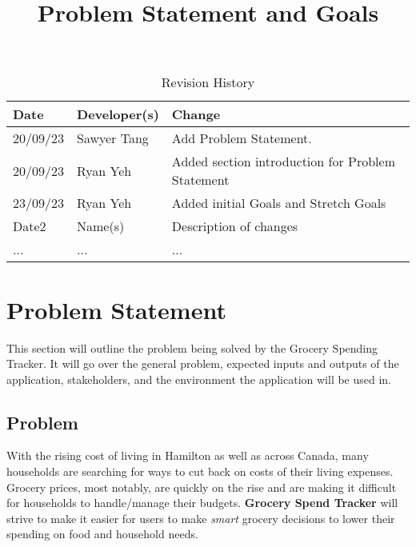 \documentclass{article}
\title{Problem Statement and Goals\\\progname}
\author{\authname}
\date{}
\begin{document}
\maketitle

\begin{table}[hp]
\caption{Revision History} \label{TblRevisionHistory}
\begin{tabularx}{\textwidth}{llX}
\toprule
\textbf{Date} & \textbf{Developer(s)} & \textbf{Change}\\
\midrule
20/09/23 & Sawyer Tang & Add Problem Statement.\\
20/09/23 & Ryan Yeh & Added section introduction for Problem Statement\\
23/09/23 & Ryan Yeh & Added initial Goals and Stretch Goals\\
Date2 & Name(s) & Description of changes\\
... & ... & ...\\
\bottomrule
\end{tabularx}
\end{table}

\section{Problem Statement}


This section will outline the problem being solved by the Grocery Spending Tracker. It will go
over the general problem, expected inputs and outputs of the application, stakeholders, and the environment
the application will be used in.

\subsection{Problem}

With the rising cost of living in Hamilton as well as across Canada, many households are searching for ways to cut back on costs of their living expenses. Grocery prices, most notably, are quickly on the rise and are making it difficult for households to handle/manage their budgets. \textbf{Grocery Spend Tracker} will strive to make it easier for users to make \textit{smart} grocery decisions to lower their spending on food and household needs.
\end{document}
